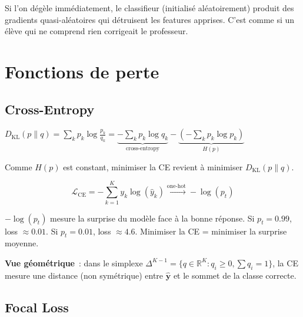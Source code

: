 \documentclass[11pt,a4paper]{article}
\newcommand{\R}{\mathbb{R}}
\begin{document}
\begin{warnbox}
Si l'on d\'eg\`ele imm\'ediatement, le classifieur (initialis\'e al\'eatoirement) produit des gradients quasi-al\'eatoires qui d\'etruisent les features apprises. C'est comme si un \'el\`eve qui ne comprend rien corrigeait le professeur.
\end{warnbox}

\section{Fonctions de perte}

\subsection{Cross-Entropy}

\begin{rappelbox}
$D_{\text{KL}}(p \| q) = \sum_k p_k \log \frac{p_k}{q_k} = \underbrace{-\sum_k p_k \log q_k}_{\text{cross-entropy}} - \underbrace{(-\sum_k p_k \log p_k)}_{H(p)}$

Comme $H(p)$ est constant, minimiser la CE revient \`a minimiser $D_{\text{KL}}(p \| q)$.
\end{rappelbox}

\begin{equation}
  \mathcal{L}_{\text{CE}} = -\sum_{k=1}^{K} y_k \log(\hat{y}_k) \xrightarrow{\text{one-hot}} -\log(p_t)
\end{equation}

\begin{intubox}
$-\log(p_t)$ mesure la \og{}surprise\fg{} du mod\`ele face \`a la bonne r\'eponse. Si $p_t = 0.99$, loss $\approx 0.01$. Si $p_t = 0.01$, loss $\approx 4.6$. Minimiser la CE = minimiser la surprise moyenne.

\textbf{Vue g\'eom\'etrique}~: dans le simplexe $\Delta^{K-1} = \{q \in \R^K : q_i \geq 0, \sum q_i = 1\}$, la CE mesure une \og{}distance\fg{} (non sym\'etrique) entre $\hat{\mathbf{y}}$ et le sommet de la classe correcte.
\end{intubox}

\subsection{Focal Loss}
\end{document}
